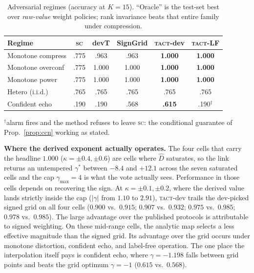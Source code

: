 \documentclass{article}
\newcommand{\Dhat}{\widehat{D}}
\newcommand{\SC}{\textsc{sc}}
\newcommand{\TACT}{\textsc{tact}}
\begin{document}
\begin{table}[t]
\centering
\caption{Adversarial regimes (accuracy at $K{=}15$). ``Oracle'' is the test-set best over \emph{raw-value} weight policies; rank invariance beats that entire family under compression.}
\label{tab:adv}
\setlength{\tabcolsep}{3.2pt}
\begin{tabular}{l cc cc c}
\toprule
Regime & \SC & devT & SignGrid & \textbf{\TACT-dev} & \textbf{\TACT-LF}\\
\midrule
Monotone compress & .775 & .963 & .963 & \textbf{1.000} & \textbf{1.000}\\
Monotone overconf & .775 & 1.000 & 1.000 & \textbf{1.000} & \textbf{1.000}\\
Monotone power & .775 & 1.000 & 1.000 & \textbf{1.000} & \textbf{1.000}\\
Hetero (i.i.d.) & .765 & .765 & .765 & .765 & .765\\
Confident echo & .190 & .190 & .568 & \textbf{.615} & .190$^{\dagger}$\\
\bottomrule
\end{tabular}
\vspace{2pt}
{\footnotesize $^{\dagger}$alarm fires and the method refuses to leave \SC:
the conditional guarantee of Prop.~\ref{prop:ccn} working as stated.}
\end{table}


\textbf{Where the derived exponent actually operates.} The four cells that
carry the headline $1.000$ ($\kappa=\pm0.4,\pm0.6$) are cells where $\Dhat$
saturates, so the link returns an untempered $\gamma^\ast$ between $-8.4$ and
$+12.1$ across the seven saturated cells and the cap $\gamma_{\max}=4$ is what
the vote actually sees. Performance in those cells depends on recovering the
sign. At $\kappa=\pm0.1,\pm0.2$, where the
derived value lands strictly inside the cap ($|\gamma|$ from $1.10$ to $2.91$),
\TACT-dev trails the dev-picked signed grid on all four cells ($0.900$ vs.\
$0.915$; $0.907$ vs.\ $0.932$; $0.975$ vs.\ $0.985$; $0.978$ vs.\ $0.985$).
The large advantage over the published protocols is attributable to signed
weighting. On these mid-range cells, the analytic map selects a less effective
magnitude than the signed grid. Its
advantage over the grid occurs under monotone distortion, confident echo, and
label-free operation. The
one place the interpolation itself pays is confident echo, where $\gamma=-1.198$
falls between grid points and beats the grid optimum $\gamma=-1$
($0.615$ vs.\ $0.568$).
\end{document}
